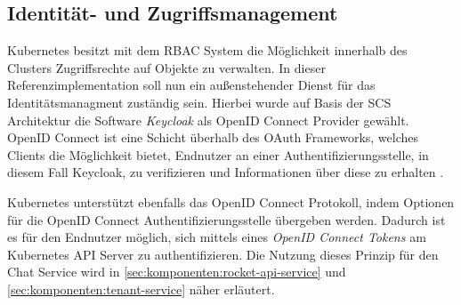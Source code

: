 \subsection{Identität- und Zugriffsmanagement}
Kubernetes besitzt mit dem \ac{RBAC} System die Möglichkeit innerhalb des Clusters Zugriffsrechte auf Objekte
zu verwalten. In dieser Referenzimplementation soll nun ein außenstehender Dienst für das Identitätsmanagment
zuständig sein. Hierbei wurde auf Basis der \ac{SCS} Architektur die Software \emph{Keycloak} als OpenID Connect Provider gewählt.
OpenID Connect ist eine Schicht überhalb des OAuth Frameworks, welches Clients die Möglichkeit bietet, Endnutzer
an einer Authentifizierungsstelle, in diesem Fall Keycloak, zu verifizieren und Informationen über diese zu erhalten \cite{OpenID2021}.


Kubernetes unterstützt ebenfalls das OpenID Connect Protokoll, indem Optionen für die OpenID Connect Authentifizierungsstelle
übergeben werden. Dadurch ist es für den Endnutzer möglich, sich mittels eines \emph{OpenID Connect Tokens} am 
Kubernetes API Server zu authentifizieren. Die Nutzung dieses Prinzip für den Chat Service wird 
in \ref{sec:komponenten:rocket-api-service} und \ref{sec:komponenten:tenant-service} näher erläutert.